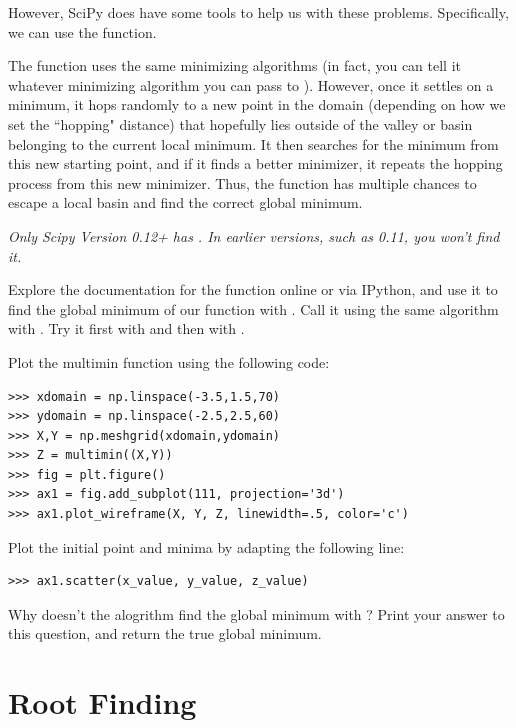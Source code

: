 However, SciPy does have some tools to help us with these problems. 
Specifically, we can use the  function.

The  function uses the same minimizing algorithms (in fact, you can tell it whatever minimizing algorithm you can pass to ).
However, once it settles on a minimum, it hops randomly to a new point in the domain (depending on how we set the ``hopping" distance) that hopefully lies outside of the valley
or basin belonging to the current local minimum.
It then searches for the minimum from this new starting point, and if it finds a better minimizer, it repeats the hopping process from this new minimizer. 
Thus, the  function has multiple chances to escape a local basin and find the correct global minimum. 

\emph{Only Scipy Version 0.12+ has . In earlier versions, such as 0.11, you won't find it.}

\begin{problem} %
Explore the documentation for the  function online or via IPython, and use it to find the global minimum of our  function with .
Call it using the same  algorithm with .
Try it first with  and then with . 

Plot the multimin function using the following code:
\begin{lstlisting}
>>> xdomain = np.linspace(-3.5,1.5,70)
>>> ydomain = np.linspace(-2.5,2.5,60)
>>> X,Y = np.meshgrid(xdomain,ydomain)
>>> Z = multimin((X,Y))
>>> fig = plt.figure()
>>> ax1 = fig.add_subplot(111, projection='3d')
>>> ax1.plot_wireframe(X, Y, Z, linewidth=.5, color='c')
\end{lstlisting}

Plot the initial point and minima by adapting the following line:
\begin{lstlisting}
>>> ax1.scatter(x_value, y_value, z_value)     
\end{lstlisting}

Why doesn't the alogrithm find the global minimum with ?
Print your answer to this question, and return the true global minimum.
\end{problem}

\section*{Root Finding} %

